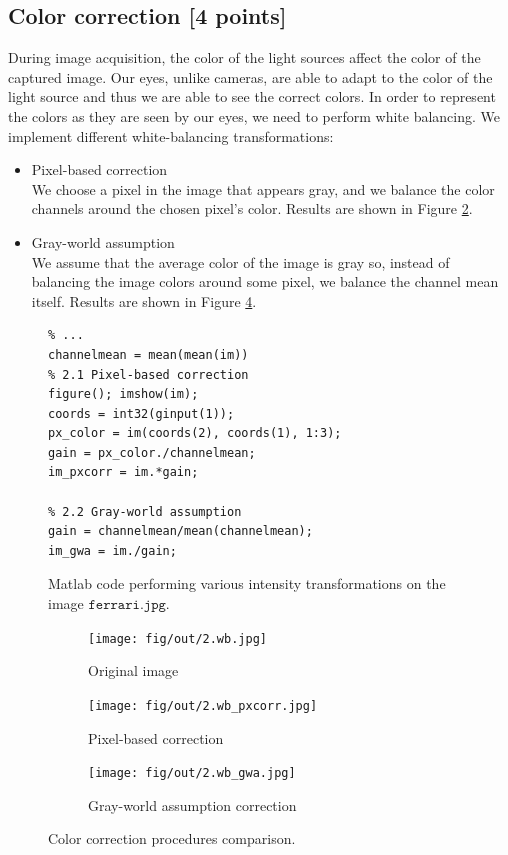 \documentclass[tikz,14pt,fleqn]{article}
\begin{document}
\subsection{Color correction [4 points]}
During image acquisition, the color of the light sources affect the color of the captured image. Our eyes, unlike cameras, are able to adapt to the color of the light source and thus we are able to see the correct colors. In order to represent the colors as they are seen by our eyes, we need to perform white balancing. We implement different white-balancing transformations:
\begin{itemize}
    \item Pixel-based correction\\
    We choose a pixel in the image that appears gray, and we balance the color channels around the chosen pixel's color. Results are shown in Figure \ref{fig:2.wb_pxcorr}.
    \item Gray-world assumption\\
    We assume that the average color of the image is gray so, instead of balancing the image colors around some pixel, we balance the channel mean itself. Results are shown in Figure \ref{fig:2.wb_gwa}.
\end{itemize}
\begin{figure}[h!]
    \begin{verbatim} 
% ...
channelmean = mean(mean(im))
% 2.1 Pixel-based correction
figure(); imshow(im);
coords = int32(ginput(1));
px_color = im(coords(2), coords(1), 1:3);
gain = px_color./channelmean;
im_pxcorr = im.*gain;

% 2.2 Gray-world assumption
gain = channelmean/mean(channelmean);
im_gwa = im./gain;
        \end{verbatim}
\caption{Matlab code performing various intensity transformations on the image $\texttt{ferrari.jpg}$.}
\end{figure}
\begin{figure}[h!]
    \begin{center}
    \begin{subfigure}{0.31\linewidth}
        \centering
        \texttt{[image: fig/out/2.wb.jpg]}
        \caption{Original image}
        \label{fig:2.wb}
    \end{subfigure}
    \begin{subfigure}{0.31\linewidth}
        \centering
        \texttt{[image: fig/out/2.wb\_pxcorr.jpg]}
        \caption{Pixel-based correction}
        \label{fig:2.wb_pxcorr}
    \end{subfigure}
    \begin{subfigure}{0.31\linewidth}
        \centering
        \texttt{[image: fig/out/2.wb\_gwa.jpg]}
        \caption{Gray-world assumption correction}
        \label{fig:2.wb_gwa}
    \end{subfigure}
    \caption{Color correction procedures comparison.}
\end{center}
\end{figure}
\end{document}
